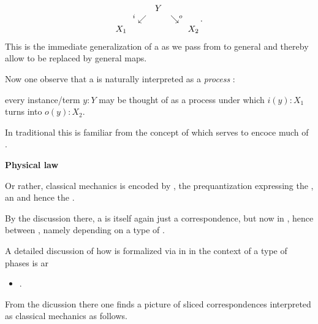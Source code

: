 \documentclass[12pt,titlepage]{article}
\def\mathllap{\mathpalette\mathllapinternal}
\def\mathrlap{\mathpalette\mathrlapinternal}
\def\mathllapinternal#1#2{\llap{$\mathsurround=0pt#1{#2}$}}
\def\mathrlapinternal#1#2{\rlap{$\mathsurround=0pt#1{#2}$}}
\newcommand{\itexarray}[1]{\begin{matrix}#1\end{matrix}}
\theoremstyle{plain}
\theoremstyle{definition}
\theoremstyle{remark}
\begin{document}
\begin{displaymath}
\itexarray{
    && Y
    \\
    & {}^{\mathllap{i}}\swarrow && \searrow^{\mathrlap{o}}
    \\
    X_1 && && X_2
  }
  \,.
\end{displaymath}
This is the immediate generalization of a  as we pass from  to general  and thereby allow  to be replaced by general maps.

Now one observe that a  is naturally interpreted as a \emph{process} :

every instance/term $y\colon Y$ may be thought of as a process under which $i(y) \colon X_1$ turns into $o(y) \colon X_2$.

In traditional  this is familiar from the concept of  which serves to encoce much of .

\textbf{Physical law}

Or rather, classical mechanics is encoded by , the prequantization expressing the , an  and hence the .

By the discussion there, a  is itself again just a correspondence, but now in , hence between , namely depending on a type of .

A detailed discussion of how  is formalized via  in  in the context of a type of phases is ar

\begin{itemize}%
\item \emph{}.

\end{itemize}
From the dicussion there one finds a picture of sliced correspondences interpreted as classical mechanics as follows.
\end{document}
